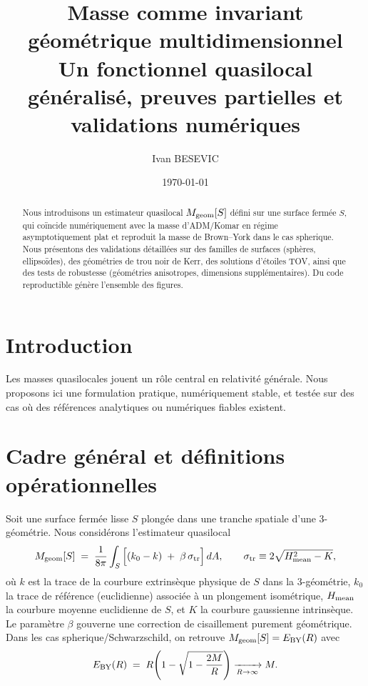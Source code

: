 \documentclass[11pt,a4paper]{article}
\title{Masse comme invariant géométrique multidimensionnel\\
\large Un fonctionnel quasilocal généralisé, preuves partielles et validations numériques}
\author{Ivan BESEVIC}
\date{\today}
\theoremstyle{remark}
\begin{document}
\maketitle

\begin{abstract}
Nous introduisons un estimateur quasilocal $M_{\rm geom}[S]$ défini sur une surface fermée $S$,
qui coïncide numériquement avec la masse d'ADM/Komar en régime asymptotiquement plat et reproduit la
masse de Brown--York dans le cas spherique. Nous présentons des validations détaillées sur des familles
de surfaces (sphères, ellipsoïdes), des géométries de trou noir de Kerr, des solutions d'étoiles TOV,
ainsi que des tests de robustesse (géométries anisotropes, dimensions supplémentaires). Du code
reproductible génère l'ensemble des figures.
\end{abstract}

\section{Introduction}
Les masses quasilocales jouent un rôle central en relativité générale.
Nous proposons ici une formulation pratique, numériquement stable, et testée sur des cas
où des références analytiques ou numériques fiables existent.


\section{Cadre général et définitions opérationnelles}
Soit une surface fermée lisse $S$ plongée dans une tranche spatiale d'une 3-géométrie.
Nous considérons l'estimateur quasilocal
\begin{equation}
  M_{\rm geom}[S] \;=\; \frac{1}{8\pi}\int_S \Big[ (k_0 - k) \;+\; \beta\,\sigma_{\rm tr} \Big]\, dA,
  \qquad \sigma_{\rm tr} \equiv 2\sqrt{H_{\rm mean}^2 - K},
\end{equation}
où $k$ est la trace de la courbure extrinsèque physique de $S$ dans la 3-géométrie,
$k_0$ la trace de référence (euclidienne) associée à un plongement isométrique,
$H_{\rm mean}$ la courbure moyenne euclidienne de $S$, et $K$ la courbure gaussienne intrinsèque.
Le paramètre $\beta$ gouverne une correction de cisaillement purement géométrique.
Dans les cas spherique/Schwarzschild, on retrouve $M_{\rm geom}[S]=E_{\rm BY}(R)$ avec
\begin{equation}
  E_{\rm BY}(R)
  \;=\; R\!\left(1-\sqrt{1-\frac{2M}{R}}\right)
  \xrightarrow[R\to\infty]{} M.
\end{equation}
\end{document}
